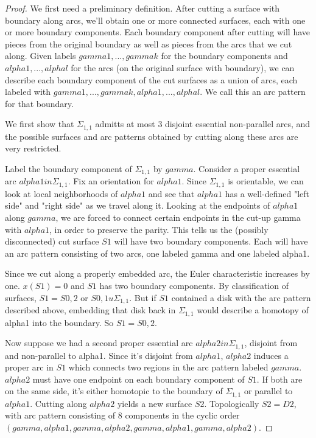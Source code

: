 \documentclass[12pt]{amsart}
\theoremstyle{definition}
\newcommand{\Si}{\Sigma}
\begin{document}
\begin{proof}

We first need a preliminary definition. After cutting a surface with
boundary along arcs, we'll obtain one or more connected surfaces, each with one
or more boundary components. Each boundary component after cutting will have
pieces from the original boundary as well as pieces from the arcs that we cut
along. Given labels $gamma1,...,gammak$ for the boundary components and
$alpha1,...,alphal$ for the arcs (on the original surface with boundary), we can
describe each boundary component of the cut surfaces as a union of arcs, each
labeled with $gamma1,...,gammak,alpha1,...,alphal$. We call this an arc pattern
for that boundary.

We first show that $\Si_{1,1}$ admitts at most 3 disjoint essential non-parallel arcs,
and the possible surfaces and arc patterns obtained by cutting along these arcs
are very restricted.

Label the boundary component of $\Si_{1,1}$ by $gamma$. Consider a proper essential arc
$alpha1 in \Si_{1,1}$. Fix an orientation for $alpha1$. Since $\Si_{1,1}$ is orientable, we can
look at local neighborhoods of $alpha1$ and see that $alpha1$ has a well-defined
"left side" and "right side" as we travel along it. Looking at the endpoints of
$alpha1$ along $gamma$, we are forced to connect certain endpoints in the cut-up
gamma with $alpha1$, in order to preserve the parity. This tells us the (possibly
disconnected) cut surface $S1$ will have two boundary components. Each will have
an arc pattern consisting of two arcs, one labeled gamma and one labeled
alpha1.

Since we cut along a properly embedded arc, the Euler characteristic increases
by one. $x(S1)=0$ and $S1$ has two boundary components. By classification of
surfaces, $S1 = S0,2$ or $S0,1 u \Si_{1,1}$. But if $S1$ contained a disk with the arc
pattern described above, embedding that disk back in $\Si_{1,1}$ would describe
a homotopy of alpha1 into the boundary. So $S1 = S0,2$.

Now suppose we had a second proper essential arc $alpha2 in \Si_{1,1}$, disjoint from
and non-parallel to alpha1. Since it's disjoint from $alpha1$, $alpha2$ induces
a proper arc in $S1$ which connects two regions in the arc pattern labeled
$gamma$.
$alpha2$ must have one endpoint on each boundary component of $S1$. If both are on
the same side, it's either homotopic to the boundary of $\Si_{1,1}$ or parallel to
$alpha1$. Cutting along $alpha2$ yields a new surface $S2$. Topologically
$S2=D2$, with
arc pattern consisting of 8 components in the cyclic order
$(gamma,alpha1,gamma,alpha2,gamma,alpha1,gamma,alpha2)$.


\end{proof}
\end{document}
